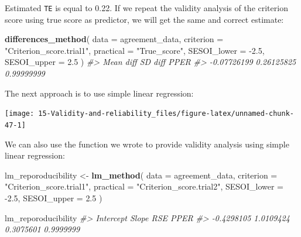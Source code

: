 \documentclass[
]{book}
\newenvironment{Shaded}{\begin{snugshade}}{\end{snugshade}}
\newcommand{\CommentTok}[1]{\textcolor[rgb]{0.56,0.35,0.01}{\textit{#1}}}
\newcommand{\DataTypeTok}[1]{\textcolor[rgb]{0.13,0.29,0.53}{#1}}
\newcommand{\FloatTok}[1]{\textcolor[rgb]{0.00,0.00,0.81}{#1}}
\newcommand{\KeywordTok}[1]{\textcolor[rgb]{0.13,0.29,0.53}{\textbf{#1}}}
\newcommand{\NormalTok}[1]{#1}
\newcommand{\OperatorTok}[1]{\textcolor[rgb]{0.81,0.36,0.00}{\textbf{#1}}}
\newcommand{\StringTok}[1]{\textcolor[rgb]{0.31,0.60,0.02}{#1}}
\begin{document}
Estimated \texttt{TE} is equal to 0.22. If we repeat the validity analysis of the criterion score using true score as predictor, we will get the same and correct estimate:

\begin{Shaded}
\begin{Highlighting}[]
\KeywordTok{differences\_method}\NormalTok{(}
  \DataTypeTok{data =}\NormalTok{ agreement\_data,}
  \DataTypeTok{criterion =} \StringTok{"Criterion\_score.trial1"}\NormalTok{,}
  \DataTypeTok{practical =} \StringTok{"True\_score"}\NormalTok{,}
  \DataTypeTok{SESOI\_lower =} \FloatTok{{-}2.5}\NormalTok{,}
  \DataTypeTok{SESOI\_upper =} \FloatTok{2.5}
\NormalTok{)}
\CommentTok{\#>   Mean diff     SD diff        PPER }
\CommentTok{\#> {-}0.07726199  0.26125825  0.99999999}
\end{Highlighting}
\end{Shaded}

The next approach is to use simple linear regression:

\begin{Shaded}
\end{Shaded}

\begin{center}\texttt{[image: 15-Validity-and-reliability\_files/figure-latex/unnamed-chunk-47-1]} \end{center}

We can also use the function we wrote to provide validity analysis using simple linear regression:

\begin{Shaded}
\begin{Highlighting}[]
\NormalTok{lm\_reporoducibility <{-}}\StringTok{ }\KeywordTok{lm\_method}\NormalTok{(}
  \DataTypeTok{data =}\NormalTok{ agreement\_data,}
  \DataTypeTok{criterion =} \StringTok{"Criterion\_score.trial1"}\NormalTok{,}
  \DataTypeTok{practical =} \StringTok{"Criterion\_score.trial2"}\NormalTok{,}
  \DataTypeTok{SESOI\_lower =} \FloatTok{{-}2.5}\NormalTok{,}
  \DataTypeTok{SESOI\_upper =} \FloatTok{2.5}
\NormalTok{)}

\NormalTok{lm\_reporoducibility}
\CommentTok{\#>  Intercept      Slope        RSE       PPER }
\CommentTok{\#> {-}0.4298105  1.0109424  0.3075601  0.9999999}
\end{Highlighting}
\end{Shaded}
\end{document}
